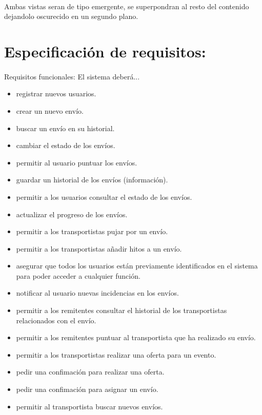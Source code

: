 \documentclass[10pt, a4paper,spanish]{article}
\begin{document}
		\paragraph{}
		Ambas vistas seran de tipo emergente, se superpondran al resto del contenido dejandolo oscurecido en un segundo plano.

	\section{Especificación de requisitos:}

		\paragraph{}
		Requisitos funcionales: El sistema deberá...

			\begin{itemize}
				\item registrar nuevos usuarios.
				\item crear un nuevo envío.
				\item buscar un envío en su historial.
				\item cambiar el estado de los envíos.
				\item permitir al usuario puntuar los envíos.
				\item guardar un historial de los envíos (información).
				\item permitir a los usuarios consultar el estado de los envíos.
				\item actualizar el progreso de los envíos.
				\item permitir a los transportistas pujar por un envío.
				\item permitir a los transportistas añadir hitos a un envío.
				\item asegurar que todos los usuarios están previamente identificados en el sistema para poder acceder a cualquier función.
				\item notificar al usuario nuevas incidencias en los envíos.
				\item permitir a los remitentes consultar el historial de los transportistas relacionados con el envío.
				\item permitir a los remitentes puntuar al transportista que ha realizado su envío.
				\item permitir a los transportistas realizar una oferta para un evento.
				\item pedir una confimación para realizar una oferta.
				\item pedir una confimación para asignar un envío.
				\item permitir al transportista buscar nuevos envíos.
			\end{itemize}
\end{document}
